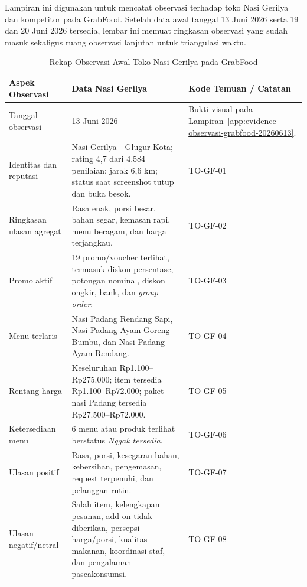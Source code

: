 \label{app:observasi-lanjutan-grabfood}

Lampiran ini digunakan untuk mencatat observasi terhadap toko Nasi Gerilya dan kompetitor pada GrabFood. Setelah data awal tanggal 13 Juni 2026 serta 19 dan 20 Juni 2026 tersedia, lembar ini memuat ringkasan observasi yang sudah masuk sekaligus ruang observasi lanjutan untuk triangulasi waktu.

\begin{table}[!htbp]
    \centering
    \caption{Rekap Observasi Awal Toko Nasi Gerilya pada GrabFood}
    \label{tab:rekap-observasi-awal-toko-grabfood}
    \footnotesize
    \setlength{\tabcolsep}{4pt}
    \renewcommand{\arraystretch}{0.95}
    \begin{tabularx}{\textwidth}{|Z{3cm}|Y|Y|}
        \toprule
        \textbf{Aspek Observasi} & \textbf{Data Nasi Gerilya} & \textbf{Kode Temuan / Catatan} \\ \hline
        \midrule
        Tanggal observasi & 13 Juni 2026 & Bukti visual pada Lampiran~\ref{app:evidence-observasi-grabfood-20260613}. \\ \hline
        Identitas dan reputasi & Nasi Gerilya - Glugur Kota; rating 4,7 dari 4.584 penilaian; jarak 6,6 km; status saat screenshot tutup dan buka besok. & TO-GF-01 \\ \hline
        Ringkasan ulasan agregat & Rasa enak, porsi besar, bahan segar, kemasan rapi, menu beragam, dan harga terjangkau. & TO-GF-02 \\ \hline
        Promo aktif & 19 promo/voucher terlihat, termasuk diskon persentase, potongan nominal, diskon ongkir, bank, dan \textit{group order}. & TO-GF-03 \\ \hline
        Menu terlaris & Nasi Padang Rendang Sapi, Nasi Padang Ayam Goreng Bumbu, dan Nasi Padang Ayam Rendang. & TO-GF-04 \\ \hline
        Rentang harga & Keseluruhan Rp1.100--Rp275.000; item tersedia Rp1.100--Rp72.000; paket nasi Padang tersedia Rp27.500--Rp72.000. & TO-GF-05 \\ \hline
        Ketersediaan menu & 6 menu atau produk terlihat berstatus \textit{Nggak tersedia}. & TO-GF-06 \\ \hline
        Ulasan positif & Rasa, porsi, kesegaran bahan, kebersihan, pengemasan, request terpenuhi, dan pelanggan rutin. & TO-GF-07 \\ \hline
        Ulasan negatif/netral & Salah item, kelengkapan pesanan, add-on tidak diberikan, persepsi harga/porsi, kualitas makanan, koordinasi staf, dan pengalaman pascakonsumsi. & TO-GF-08 \\ \hline
        \bottomrule
    \end{tabularx}
\end{table}

